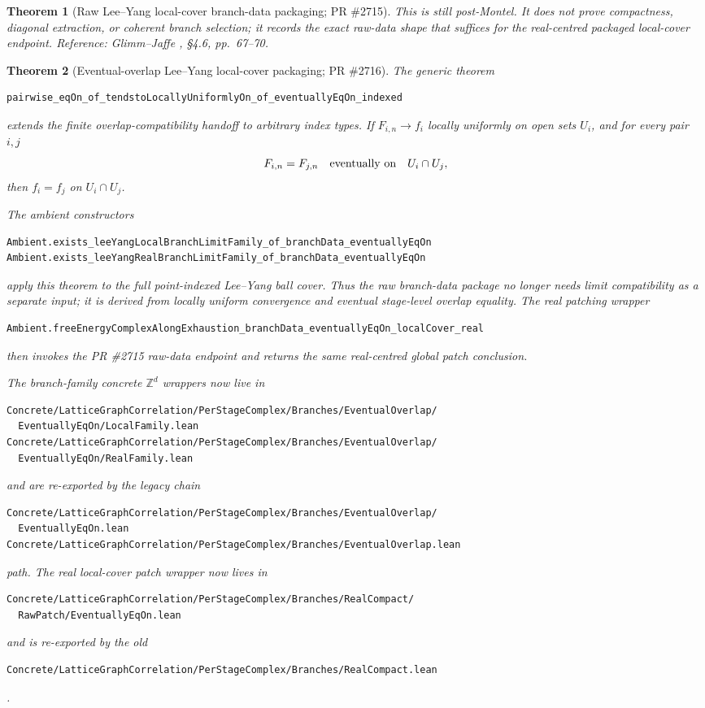 \documentclass[a4paper,11pt]{article}
\newtheorem{theorem}{Theorem}
\begin{document}
\begin{theorem}[Raw Lee--Yang local-cover branch-data packaging; PR \#2715]
This is still post-Montel.  It does not prove compactness, diagonal
extraction, or coherent branch selection; it records the exact raw-data shape
that suffices for the real-centred packaged local-cover endpoint.
Reference: Glimm--Jaffe \cite{glimm-jaffe}, \S 4.6, pp.~67--70.
\end{theorem}

\begin{theorem}[Eventual-overlap Lee--Yang local-cover packaging; PR \#2716]
The generic theorem
\begin{Verbatim}
pairwise_eqOn_of_tendstoLocallyUniformlyOn_of_eventuallyEqOn_indexed
\end{Verbatim}
extends the finite overlap-compatibility handoff to arbitrary index types.  If
\(F_{i,n}\to f_i\) locally uniformly on open sets \(U_i\), and for every pair
\(i,j\)
\[
  F_{i,n}=F_{j,n}
  \quad\hbox{eventually on}\quad U_i\cap U_j,
\]
then \(f_i=f_j\) on \(U_i\cap U_j\).

The ambient constructors
\begin{Verbatim}
Ambient.exists_leeYangLocalBranchLimitFamily_of_branchData_eventuallyEqOn
Ambient.exists_leeYangRealBranchLimitFamily_of_branchData_eventuallyEqOn
\end{Verbatim}
apply this theorem to the full point-indexed Lee--Yang ball cover.  Thus the
raw branch-data package no longer needs limit compatibility as a separate
input; it is derived from locally uniform convergence and eventual
stage-level overlap equality.  The real patching wrapper
\begin{Verbatim}
Ambient.freeEnergyComplexAlongExhaustion_branchData_eventuallyEqOn_localCover_real
\end{Verbatim}
then invokes the PR \#2715 raw-data endpoint and returns the same real-centred
global patch conclusion.

The branch-family concrete \(\mathbb Z^d\) wrappers now live in
\begin{Verbatim}
Concrete/LatticeGraphCorrelation/PerStageComplex/Branches/EventualOverlap/
  EventuallyEqOn/LocalFamily.lean
Concrete/LatticeGraphCorrelation/PerStageComplex/Branches/EventualOverlap/
  EventuallyEqOn/RealFamily.lean
\end{Verbatim}
and are re-exported by the legacy chain
\begin{Verbatim}
Concrete/LatticeGraphCorrelation/PerStageComplex/Branches/EventualOverlap/
  EventuallyEqOn.lean
Concrete/LatticeGraphCorrelation/PerStageComplex/Branches/EventualOverlap.lean
\end{Verbatim}
path.  The real local-cover patch wrapper now lives in
\begin{Verbatim}
Concrete/LatticeGraphCorrelation/PerStageComplex/Branches/RealCompact/
  RawPatch/EventuallyEqOn.lean
\end{Verbatim}
and is re-exported by the old
\begin{Verbatim}
Concrete/LatticeGraphCorrelation/PerStageComplex/Branches/RealCompact.lean
\end{Verbatim}
.


\end{theorem}
\end{document}
